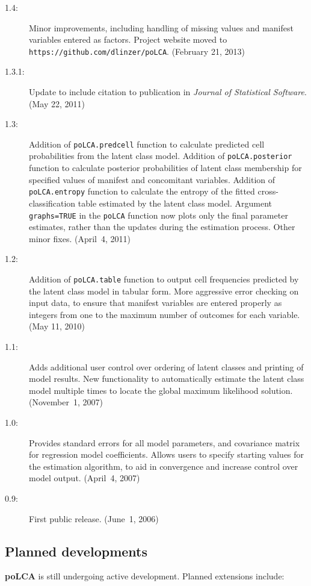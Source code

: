 \documentclass[letterpaper,12pt]{article}
\begin{document}
\begin{description}
    \item[1.4:] Minor improvements, including handling of missing values and manifest variables entered as factors. Project website moved to \texttt{https://github.com/dlinzer/poLCA}. (February 21, 2013)
    \item[1.3.1:] Update to include citation to publication in \emph{Journal of Statistical Software}. (May 22, 2011)
    \item[1.3:] Addition of \texttt{poLCA.predcell} function to calculate predicted cell probabilities from the latent class model.  Addition of \texttt{poLCA.posterior} function to calculate posterior probabilities of latent class membership for specified values of manifest and concomitant variables.  Addition of \texttt{poLCA.entropy} function to calculate the entropy of the fitted cross-classification table estimated by the latent class model.  Argument \texttt{graphs=TRUE} in the \texttt{poLCA} function now plots only the final parameter estimates, rather than the updates during the estimation process.  Other minor fixes. (April~4, 2011)
    \item[1.2:] Addition of \texttt{poLCA.table} function to output cell frequencies predicted by the latent class model in tabular form. More aggressive error checking on input data, to ensure that manifest variables are entered properly as integers from one to the maximum number of outcomes for each variable. (May 11, 2010)
    \item[1.1:] Adds additional user control over ordering of latent classes and printing of model results.  New functionality to automatically estimate the latent class model multiple times to locate the global maximum likelihood solution. (November~1, 2007)
    \item[1.0:] Provides standard errors for all model parameters, and covariance matrix for regression model coefficients. Allows users to specify starting values for the estimation algorithm, to aid in convergence and increase control over model output. (April~4, 2007)
    \item[0.9:] First public release. (June~1, 2006)
\end{description}

\subsection{Planned developments}

\textbf{poLCA} is still undergoing active development.  Planned extensions include:
\end{document}
